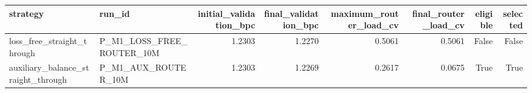 \begin{tabular}{llrrrrrr}
\toprule
strategy & run\_id & initial\_validation\_bpc & final\_validation\_bpc & maximum\_router\_load\_cv & final\_router\_load\_cv & eligible & selected \\
\midrule
loss\_free\_straight\_through & P\_M1\_LOSS\_FREE\_ROUTER\_10M & 1.2303 & 1.2270 & 0.5061 & 0.5061 & False & False \\
auxiliary\_balance\_straight\_through & P\_M1\_AUX\_ROUTER\_10M & 1.2303 & 1.2269 & 0.2617 & 0.0675 & True & True \\
\bottomrule
\end{tabular}
